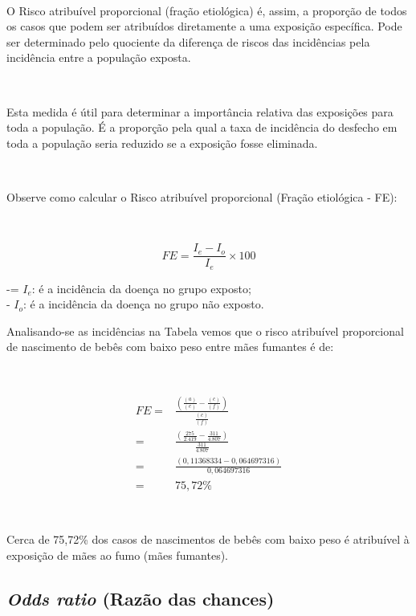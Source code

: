 \documentclass[
]{book}
\begin{document}
~

O Risco atribuível proporcional (fração etiológica) é, assim, a proporção de todos os casos que podem ser atribuídos diretamente a uma exposição específica. Pode ser determinado pelo quociente da diferença de riscos das incidências pela incidência entre a população exposta.

~

Esta medida é útil para determinar a importância relativa das exposições para toda a população. É a proporção pela qual a taxa de incidência do desfecho em toda a população seria reduzido se a exposição fosse eliminada.

~

Observe como calcular o Risco atribuível proporcional (Fração etiológica - FE):

~

\[
FE = \frac{I_{e}-I_{o}}{I_{e}} \times 100
\]

\hfill\break

-= \(I_{e}\): é a incidência da doença no grupo exposto;\\
- \(I_{o}\): é a incidência da doença no grupo não exposto.

\hfill\break

Analisando-se as incidências na Tabela vemos que o risco atribuível proporcional de nascimento de bebês com baixo peso entre mães fumantes é de:

~

\begin{align*}
FE = & \frac{\left(\frac{(a)}{(e)} - \frac{(c)}{(f)}\right)}{\frac{(c)}{(f)}}  \\
   = & \frac{\left(\frac{275}{2.419} - \frac{311}{4.807}\right)}{\frac{311}{4.807}} \\ 
   = &  \frac{\left(0,11368334 - 0,064697316\right)}{0,064697316} \\
   = & 75,72 \%
\end{align*}

~

Cerca de 75,72\% dos casos de nascimentos de bebês com baixo peso é atribuível à exposição de mães ao fumo (mães fumantes).

\hypertarget{odds-ratio-razuxe3o-das-chances}{%
\subsection{\texorpdfstring{\emph{Odds ratio} (Razão das chances)}{Odds ratio (Razão das chances)}}\label{odds-ratio-razuxe3o-das-chances}}
\end{document}
